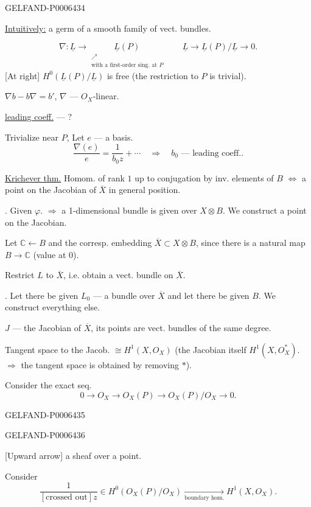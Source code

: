 \begin{GelfandAdjacentEvidence}{GELFAND-P000643}{4}


\underline{Intuitively:} a germ of a smooth family of vect. bundles.

\[
\nabla:\underline L\longrightarrow
\underset{\substack{\nearrow\\\text{with a first-order sing. at }P}}{\underline L(P)}
\qquad
\underline L\longrightarrow\underline L(P)/\underline L\longrightarrow0.
\]
[At right] \(H^0(\underline L(P)/\underline L)\) is free
(the restriction to \(P\) is trivial).

\(\nabla b-b\nabla=b'\), \(\nabla\) --- \(O_X\)-linear.

\underline{leading coeff.} --- ?

Trivialize near \(P\), Let \(e\) --- a basis.
\[
\frac{\nabla(e)}{e}=\frac{1}{b_0z}+\cdots
\quad\Rightarrow\quad b_0\text{ --- leading coeff.}.
\]

\underline{Krichever thm.}
Homom. of rank \(1\) up to conjugation by inv. elements of \(B\)
\(\Longleftrightarrow\) a point on the Jacobian of \(\overline X\) in general position.

. Given \(\varphi\). \(\Rightarrow\) a 1-dimensional bundle is given over \(X\otimes B\).
We construct a point on the Jacobian.

Let \(\mathbb C\leftarrow B\) and the corresp. embedding
\(\overline X\subset X\otimes B\), since there is a natural map \(B\to\mathbb C\)
(value at \(0\)).

Restrict \(L\) to \(\overline X\), i.e. obtain a vect. bundle on \(\overline X\).

. Let there be given \(L_0\) --- a bundle over \(\overline X\) and let there be given \(B\).
We construct everything else.

\(J\) --- the Jacobian of \(\overline X\), its points are vect. bundles of the same degree.

Tangent space to the Jacob. \(\cong H^1(X,O_X)\)
(the Jacobian itself \(H^1(X,O_X^*)\).
\(\Rightarrow\) the tangent space is obtained by removing \(*\)).

Consider the exact seq.
\[
0\longrightarrow O_X\longrightarrow O_X(P)
\longrightarrow O_X(P)/O_X\longrightarrow0.
\]
\end{GelfandAdjacentEvidence}
\begin{GelfandAdjacentEvidence}{GELFAND-P000643}{5}

\end{GelfandAdjacentEvidence}
\begin{GelfandAdjacentEvidence}{GELFAND-P000643}{6}

[Upward arrow] a sheaf over a point.

Consider
\[
\frac{1}{[\text{crossed out}]z}\in H^0(O_X(P)/O_X)
\xrightarrow[\text{boundary hom.}]{} H^1(X,O_X).
\]
\end{GelfandAdjacentEvidence}

